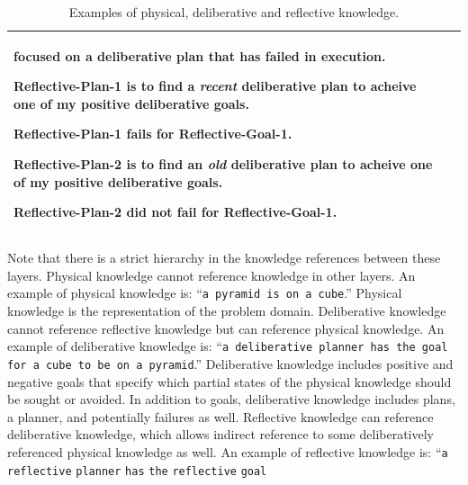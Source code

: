 \begin{table}
\begin{tabular}{|p{2cm}|p{10cm}|}
\begin{packed_itemize}
{  focused on a deliberative plan that has failed in execution.}
\item{Reflective-Plan-1 is to find a {\emph{recent}} deliberative plan
  to acheive one of my positive deliberative goals.}
\item{Reflective-Plan-1 fails for Reflective-Goal-1.}
\item{Reflective-Plan-2 is to find an {\emph{old}} deliberative plan
  to acheive one of my positive deliberative goals.}
\item{Reflective-Plan-2 did not fail for Reflective-Goal-1.}
\end{packed_itemize} \\
\hline
\end{tabular}
\caption{Examples of physical, deliberative and reflective knowledge.}
\label{table:physical_deliberative_reflective_knowledge}
\end{table}
Note that there is a strict hierarchy in the knowledge references
between these layers.  Physical knowledge cannot reference knowledge
in other layers.  An example of physical knowledge is: ``{\tt{a
    pyramid is on a cube}}.''  Physical knowledge is the
representation of the problem domain.  Deliberative knowledge cannot
reference reflective knowledge but can reference physical knowledge.
An example of deliberative knowledge is: ``{\tt{a deliberative planner
    has the goal for a cube to be on a pyramid}}.''  Deliberative
knowledge includes positive and negative goals that specify which
partial states of the physical knowledge should be sought or avoided.
In addition to goals, deliberative knowledge includes plans, a
planner, and potentially failures as well.  Reflective knowledge can
reference deliberative knowledge, which allows indirect reference to
some deliberatively referenced physical knowledge as well.  An example
of reflective knowledge is: ``{\tt{a}} {\tt{reflective}}
{\tt{planner}} {\tt{has}} {\tt{the}} {\tt{reflective}} {\tt{goal}}
